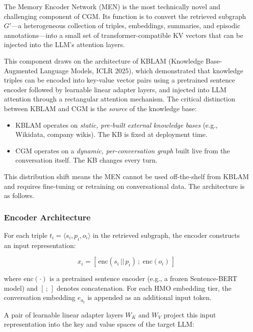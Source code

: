 \documentclass[11pt, a4paper, twoside]{article}
\theoremstyle{definition}
\newcommand{\CGM}{\textsc{CGM}\xspace}
\begin{document}
The Memory Encoder Network (MEN) is the most technically novel and challenging
component of \CGM. Its function is to convert the retrieved subgraph $G'$---a
heterogeneous collection of triples, embeddings, summaries, and episodic
annotations---into a small set of transformer-compatible KV vectors that can be
injected into the LLM's attention layers.

\medskip

This component draws on the architecture of KBLAM (Knowledge Base-Augmented Language
Models, ICLR 2025), which demonstrated that knowledge triples can be encoded into
key-value vector pairs using a pretrained sentence encoder followed by learnable
linear adapter layers, and injected into LLM attention through a rectangular
attention mechanism. The critical distinction between KBLAM and \CGM is the
\textit{source} of the knowledge base:

\begin{itemize}[leftmargin=*]
  \item KBLAM operates on \textit{static, pre-built external knowledge bases}
    (e.g., Wikidata, company wikis). The KB is fixed at deployment time.
  \item \CGM operates on a \textit{dynamic, per-conversation graph} built live
    from the conversation itself. The KB changes every turn.
\end{itemize}

This distribution shift means the MEN cannot be used off-the-shelf from KBLAM
and requires fine-tuning or retraining on conversational data. The architecture
is as follows.

\subsubsection{Encoder Architecture}

For each triple $t_i = \langle s_i, p_i, o_i \rangle$ in the retrieved subgraph,
the encoder constructs an input representation:

\[
x_i = [\,\text{enc}(s_i \,||\, p_i)\,;\;\text{enc}(o_i)\,]
\]

where $\text{enc}(\cdot)$ is a pretrained sentence encoder (e.g., a frozen
Sentence-BERT model) and $[\,;\,]$ denotes concatenation. For each HMO embedding
tier, the conversation embedding $e_{a_t}$ is appended as an additional input token.

A pair of learnable linear adapter layers $W_K$ and $W_V$ project this input
representation into the key and value spaces of the target LLM:
\end{document}

